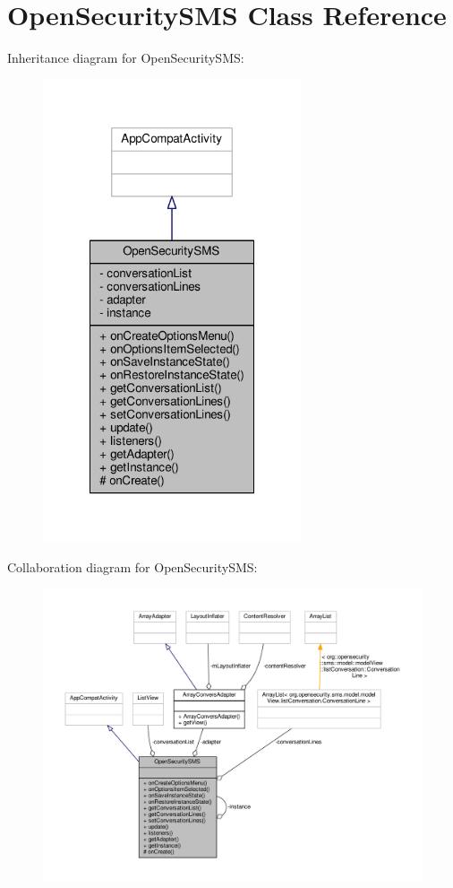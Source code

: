 \hypertarget{a00010}{\section{Open\+Security\+S\+M\+S Class Reference}
\label{a00010}
}


Inheritance diagram for Open\+Security\+S\+M\+S\+:
\nopagebreak
\begin{figure}[H]
\begin{center}
\leavevmode
\includegraphics[width=216pt]{a00077}
\end{center}
\end{figure}


Collaboration diagram for Open\+Security\+S\+M\+S\+:
\nopagebreak
\begin{figure}[H]
\begin{center}
\leavevmode
\includegraphics[width=350pt]{a00078}
\end{center}
\end{figure}
